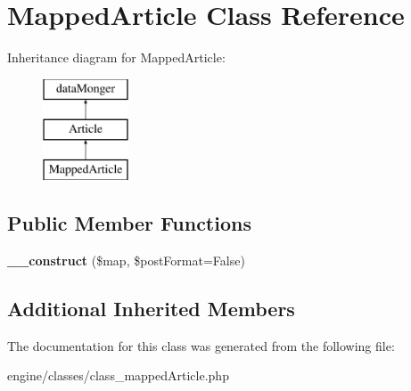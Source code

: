 \hypertarget{classMappedArticle}{\section{Mapped\-Article Class Reference}
\label{classMappedArticle}
}
Inheritance diagram for Mapped\-Article\-:\begin{figure}[H]
\begin{center}
\leavevmode
\includegraphics[height=3.000000cm]{classMappedArticle}
\end{center}
\end{figure}
\subsection*{Public Member Functions}
\begin{DoxyCompactItemize}
\item 
\hypertarget{classMappedArticle_a8a01043139b185b1f592a6362e6076a0}{{\bfseries \-\_\-\-\_\-construct} (\$map, \$post\-Format=False)}\label{classMappedArticle_a8a01043139b185b1f592a6362e6076a0}

\end{DoxyCompactItemize}
\subsection*{Additional Inherited Members}


The documentation for this class was generated from the following file\-:\begin{DoxyCompactItemize}
\item 
engine/classes/class\-\_\-mapped\-Article.\-php\end{DoxyCompactItemize}
